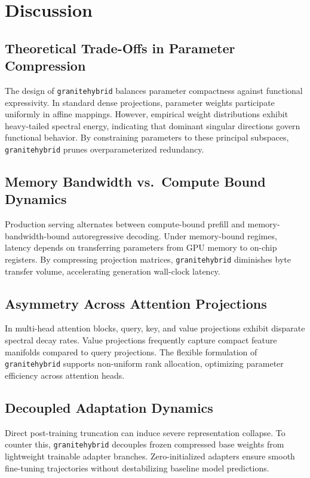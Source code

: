 \section{Discussion}

\subsection{Theoretical Trade-Offs in Parameter Compression}
The design of \texttt{granitehybrid} balances parameter compactness against functional expressivity. In standard dense projections, parameter weights participate uniformly in affine mappings. However, empirical weight distributions exhibit heavy-tailed spectral energy, indicating that dominant singular directions govern functional behavior. By constraining parameters to these principal subspaces, \texttt{granitehybrid} prunes overparameterized redundancy.

\subsection{Memory Bandwidth vs.\ Compute Bound Dynamics}
Production serving alternates between compute-bound prefill and memory-bandwidth-bound autoregressive decoding. Under memory-bound regimes, latency depends on transferring parameters from GPU memory to on-chip registers. By compressing projection matrices, \texttt{granitehybrid} diminishes byte transfer volume, accelerating generation wall-clock latency.

\subsection{Asymmetry Across Attention Projections}
In multi-head attention blocks, query, key, and value projections exhibit disparate spectral decay rates. Value projections frequently capture compact feature manifolds compared to query projections. The flexible formulation of \texttt{granitehybrid} supports non-uniform rank allocation, optimizing parameter efficiency across attention heads.

\subsection{Decoupled Adaptation Dynamics}
Direct post-training truncation can induce severe representation collapse. To counter this, \texttt{granitehybrid} decouples frozen compressed base weights from lightweight trainable adapter branches. Zero-initialized adapters ensure smooth fine-tuning trajectories without destabilizing baseline model predictions.

